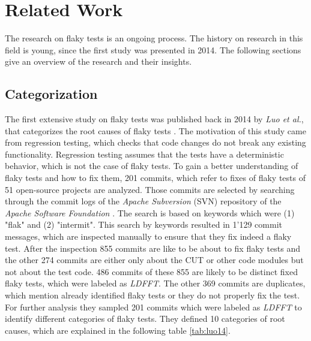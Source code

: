 \documentclass{seal_thesis}
\begin{document}




\chapter{Related Work} \label{related_work}
The research on flaky tests is an ongoing process. The history on research in this field is young, since the first study was presented in 2014. The following sections give an overview of the research and their insights.

\section{Categorization} \label{sec:categorization}
The first extensive study on flaky tests was published back in 2014 by \textit{Luo et al.}\cite{luo14}, that categorizes the root causes of flaky tests \cite{luo14}. The motivation of this study came from regression testing, which checks that code changes do not break any existing functionality. Regression testing assumes that the tests have a deterministic behavior, which is not the case of flaky tests. To gain a better understanding of flaky tests and how to fix them, 201 commits, which refer to fixes of flaky tests of 51 open-source projects are analyzed. Those commits are selected by searching through the commit logs of the \textit{Apache Subversion} (SVN) \cite{svn} repository of the \textit{Apache Software Foundation} \cite{apache}. The search is based on keywords which were (1) "flak" and (2) "intermit". This search by keywords resulted in 1'129 commit messages, which are inspected manually to ensure that they fix indeed a flaky test. After the inspection 855 commits are like to be about to fix flaky tests and the other 274 commits are either only about the CUT or other code modules but not about the test code. 486 commits of these 855 are likely to be distinct fixed flaky tests, which were labeled as \textit{LDFFT}. The other 369 commits are duplicates, which mention already identified flaky tests or they do not properly fix the test. For further analysis they sampled 201 commits which were labeled as \textit{LDFFT} to identify different categories of flaky tests. They defined 10 categories of root causes, which are explained in the following table \ref{tab:luo14}.\\
\end{document}
